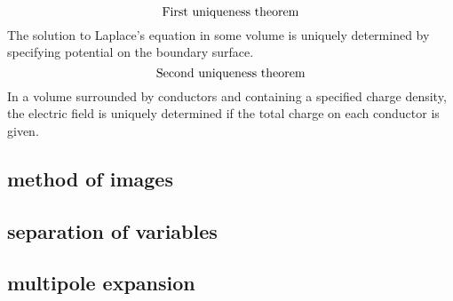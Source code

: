 \[\qq{First uniqueness theorem}\]
The solution to Laplace's equation in some volume is uniquely determined by specifying potential on the boundary surface.
\[\qq{Second uniqueness theorem}\]
In a volume surrounded by conductors and containing a specified charge density, the electric field is uniquely determined if the total charge on each conductor is given.

\subsection*{method of images}

\subsection*{separation of variables}

\subsection*{multipole expansion}